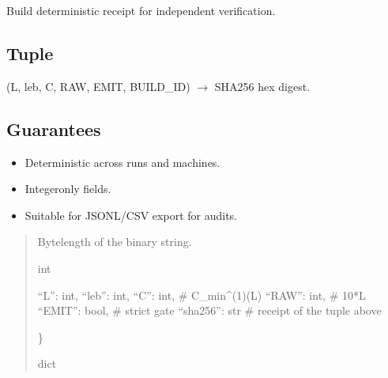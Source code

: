 \documentclass[letterpaper,10pt,english]{sphinxmanual}
\begin{document}
\begin{fulllineitems}
\label{\detokenize{clf_maximal_validator:CLF_MAXIMAL_VALIDATOR_FINAL.receipt}}
\pysigstartsignatures
\pysiglinewithargsret
{}
{}
{}
\pysigstopsignatures
\sphinxAtStartPar
Build deterministic receipt for independent verification.


\subsection{Tuple}
\label{\detokenize{clf_maximal_validator:tuple}}
\sphinxAtStartPar
(L, leb, C, RAW, EMIT, BUILD\_ID)  \(\rightarrow\) SHA256 hex digest.


\subsection{Guarantees}
\label{\detokenize{clf_maximal_validator:guarantees}}\begin{itemize}
\item {} 
\sphinxAtStartPar
Deterministic across runs and machines.

\item {} 
\sphinxAtStartPar
Integer\sphinxhyphen{}only fields.

\item {} 
\sphinxAtStartPar
Suitable for JSONL/CSV export for audits.

\end{itemize}
\begin{quote}\begin{description}
\sphinxAtStartPar
{}

\sphinxAtStartPar
Byte\sphinxhyphen{}length of the binary string.

\sphinxAtStartPar
int

\begin{description}
\sphinxlineitem{\{}
\sphinxAtStartPar
“L”: int,
“leb”: int,
“C”: int,       \# C\_min\textasciicircum{}(1)(L)
“RAW”: int,     \# 10*L
“EMIT”: bool,   \# strict gate
“sha256”: str   \# receipt of the tuple above

\end{description}

\sphinxAtStartPar
\}

\sphinxAtStartPar
dict

\end{description}\end{quote}

\end{fulllineitems}
\end{document}
